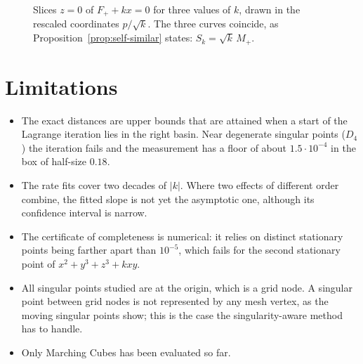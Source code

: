 \begin{figure}[!h]
\centering
{}
\caption[Self-similarity]{Slices $z=0$ of $F_++kx=0$ for three values of $k$,
drawn in the rescaled coordinates $p/\sqrt{k}$. The three curves coincide, as
Proposition~\ref{prop:self-similar} states: $S_k=\sqrt{k}\,M_+$.}
\label{fig:self-similar}
\end{figure}

\section{Limitations}
\label{sec:exp-limitations}

\begin{itemize}
    \item The exact distances are upper bounds that are attained when a start of
          the Lagrange iteration lies in the right basin. Near degenerate singular
          points ($D_4$) the iteration fails and the measurement has a floor of
          about $1.5\cdot10^{-4}$ in the box of half-size $0.18$.
    \item The rate fits cover two decades of $|k|$. Where two effects of
          different order combine, the fitted slope is not yet the asymptotic
          one, although its confidence interval is narrow.
    \item The certificate of completeness is numerical: it relies on distinct
          stationary points being farther apart than $10^{-5}$, which fails for
          the second stationary point of $x^2+y^3+z^3+kxy$.
    \item All singular points studied are at the origin, which is a grid node.
          A singular point between grid nodes is not represented by any mesh
          vertex, as the moving singular points show; this is the case the
          singularity-aware method has to handle.
    \item Only Marching Cubes has been evaluated so far.
\end{itemize}

